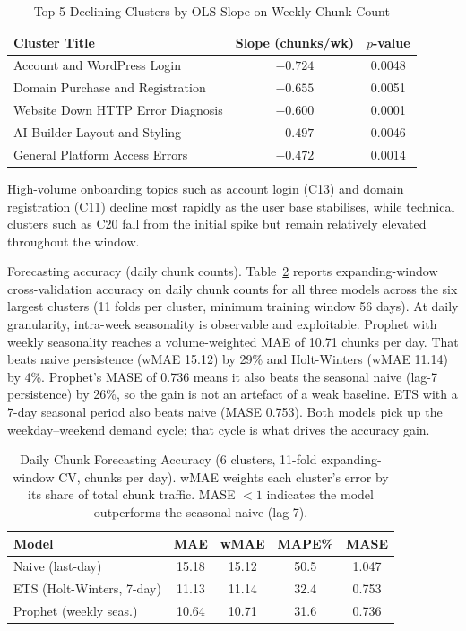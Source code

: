 \documentclass[conference]{IEEEtran}
\begin{document}
\begin{table}[!t]
\caption{Top 5 Declining Clusters by OLS Slope on Weekly Chunk Count}
\label{tab:trends}
\centering
\begin{tabular}{lcc}
\toprule
Cluster Title & Slope (chunks/wk) & $p$-value \\
\midrule
Account and WordPress Login          & $-0.724$ & 0.0048 \\
Domain Purchase and Registration     & $-0.655$ & 0.0051 \\
Website Down HTTP Error Diagnosis    & $-0.600$ & 0.0001 \\
AI Builder Layout and Styling        & $-0.497$ & 0.0046 \\
General Platform Access Errors       & $-0.472$ & 0.0014 \\
\bottomrule
\end{tabular}
\end{table}

High-volume onboarding topics such as account login (C13) and domain registration (C11) decline most rapidly as the user base stabilises, while technical clusters such as C20 fall from the initial spike but remain relatively elevated throughout the window.

Forecasting accuracy (daily chunk counts). Table~\ref{tab:forecasting} reports expanding-window cross-validation accuracy on daily chunk counts for all three models across the six largest clusters (11 folds per cluster, minimum training window 56 days). At daily granularity, intra-week seasonality is observable and exploitable. Prophet with weekly seasonality reaches a volume-weighted MAE of 10.71 chunks per day. That beats naive persistence (wMAE 15.12) by 29\% and Holt-Winters (wMAE 11.14) by 4\%. Prophet's MASE of 0.736 means it also beats the seasonal naive (lag-7 persistence) by 26\%, so the gain is not an artefact of a weak baseline. ETS with a 7-day seasonal period also beats naive (MASE 0.753). Both models pick up the weekday--weekend demand cycle; that cycle is what drives the accuracy gain.

\begin{table}[!t]
\caption{Daily Chunk Forecasting Accuracy (6 clusters, 11-fold expanding-window CV, chunks per day). wMAE weights each cluster's error by its share of total chunk traffic. MASE $<1$ indicates the model outperforms the seasonal naive (lag-7).}
\label{tab:forecasting}
\centering
\begin{tabular}{lcccc}
\toprule
Model & MAE & wMAE & MAPE\% & MASE \\
\midrule
Naive (last-day)                  & 15.18 & 15.12 & 50.5 & 1.047 \\
ETS (Holt-Winters, 7-day)         & 11.13 & 11.14 & 32.4 & 0.753 \\
Prophet (weekly seas.)   & 10.64 & 10.71 & 31.6 & 0.736 \\
\bottomrule
\end{tabular}
\end{table}
\end{document}
